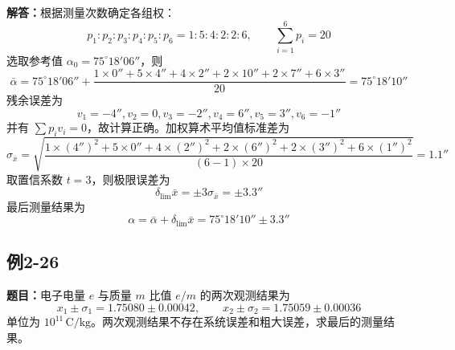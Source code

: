 \documentclass[UTF8,zihao=-4]{ctexart}
\newcommand{\problem}[1]{\subsection*{#1}}
\newcommand{\timu}{\noindent\textbf{题目：}}
\newcommand{\jieda}{\noindent\textbf{解答：}}
\begin{document}
\jieda 根据测量次数确定各组权：
\begin{equation*}
    p_1:p_2:p_3:p_4:p_5:p_6=1:5:4:2:2:6,
    \qquad
    \sum_{i=1}^{6}p_i=20
\end{equation*}
选取参考值 $\alpha_0=75^\circ18'06''$，则
\begin{equation*}
    \bar{\alpha}=75^\circ18'06''+\frac{1\times0''+5\times4''+4\times2''+2\times10''+2\times7''+6\times3''}{20}=75^\circ18'10''
\end{equation*}
残余误差为
\begin{equation*}
    v_1=-4'',	 v_2=0,	 v_3=-2'',	 v_4=6'',	 v_5=3'',	 v_6=-1''
\end{equation*}
并有 $\sum p_iv_i=0$，故计算正确。加权算术平均值标准差为
\begin{equation*}
    \sigma_{\bar{x}}=
    \sqrt{\frac{1\times(4'')^2+5\times0''+4\times(2'')^2+2\times(6'')^2+2\times(3'')^2+6\times(1'')^2}{(6-1)\times20}}
    =1.1''
\end{equation*}
取置信系数 $t=3$，则极限误差为
\begin{equation*}
    \delta_{\lim}\bar{x}=\pm3\sigma_{\bar{x}}=\pm3.3''
\end{equation*}
最后测量结果为
\begin{equation*}
    \alpha=\bar{\alpha}+\delta_{\lim}\bar{x}=75^\circ18'10''\pm3.3''
\end{equation*}

\newpage

\problem{例2-26}
\timu 电子电量 $e$ 与质量 $m$ 比值 $e/m$ 的两次观测结果为
\begin{equation*}
    x_1\pm\sigma_1=1.75080\pm0.00042,
    \qquad
    x_2\pm\sigma_2=1.75059\pm0.00036
\end{equation*}
单位为 $10^{11}\,\mathrm{C/kg}$。两次观测结果不存在系统误差和粗大误差，求最后的测量结果。
\end{document}
